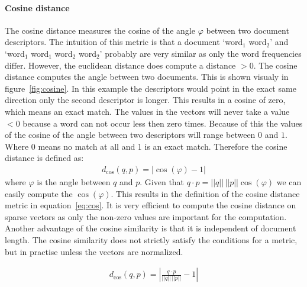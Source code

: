 \paragraph{Cosine distance} The cosine distance measures the cosine of the
angle $\varphi$ between two document descriptors. The intuition of this metric
is that a document `word$_1$ word$_2$' and `word$_1$ word$_1$ word$_2$
word$_2$' probably are very similar as only the word frequencies differ.
However, the euclidean distance does compute a distance $> 0$. The cosine
distance computes the angle between two documents. This is shown visualy in
figure~\ref{fig:cosine}. In this example the descriptors would point in the
exact same direction only the second descriptor is longer.  This results in a
cosine of zero, which means an exact match. The values in the vectors will
never take a value $< 0$ because a word can not occur less then zero times.
Because of this the values of the cosine of the angle between two descriptors
will range between $0$ and $1$. Where 0 means no match at all and 1 is an exact
match. Therefore the cosine distance is defined as:
\begin{align*}
  d_\textrm{cos}(q,p) = |\cos(\varphi) - 1|
\end{align*}
where $\varphi$ is the angle between $q$ and $p$. Given that $q \cdot p = ||q||
\,||p|| \cos(\varphi)$ we can easily compute the $\cos(\varphi)$. This results
in the definition of the cosine distance metric in equation~\ref{eq:cos}. It is
very efficient to compute the cosine distance on sparse vectors as only the
non-zero values are important for the computation. Another advantage of the
cosine similarity is that it is independent of document length. The cosine
similarity does not strictly satisfy the conditions for a metric, but in 
practise unless the vectors are normalized.

\begin{align}
  d_\textrm{cos}(q,p) = \left| \frac{q \cdot p}{||q||\,||p||} - 1\right| \label{eq:cos}
\end{align}


